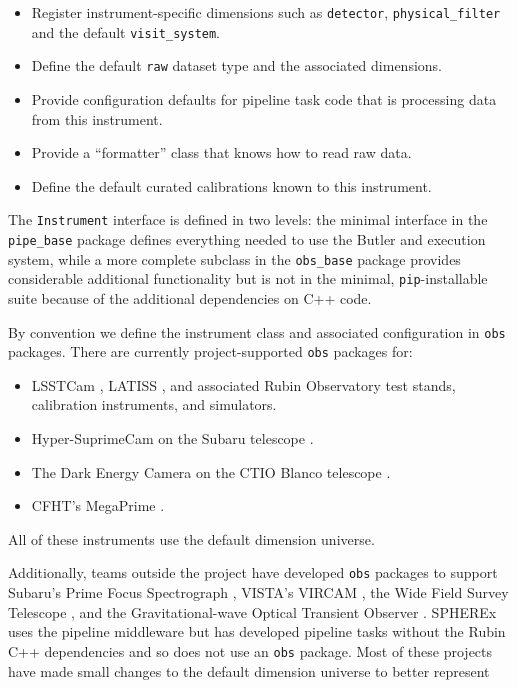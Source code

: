 \begin{itemize}
\item Register instrument-specific dimensions such as \texttt{detector}, \texttt{physical\_filter} and the default \texttt{visit\_system}.
\item Define the default \texttt{raw} dataset type and the associated dimensions.
\item Provide configuration defaults for pipeline task code that is processing data from this instrument.
\item Provide a ``formatter'' class that knows how to read raw data.
\item Define the default curated calibrations known to this instrument.
\end{itemize}

The \texttt{Instrument} interface is defined in two levels: the minimal interface in the \texttt{pipe\_base} package defines everything needed to use the Butler and execution system, while a more complete subclass in the \texttt{obs\_base} package provides considerable additional functionality but is not in the minimal, \texttt{pip}-installable suite because of the additional dependencies on C++ code.

By convention we define the instrument class and associated configuration in \texttt{obs} packages.
There are currently project-supported \texttt{obs} packages for:

\begin{itemize}
\item LSSTCam \citep{10.71929/rubin/2571927,2024SPIE13096E..1SR,2010SPIE.7735E..0JK}, LATISS \citep{10.71929/rubin/2571930,2020SPIE11452E..0UI}, and associated Rubin Observatory test stands, calibration instruments, and simulators.
\item Hyper-SuprimeCam on the Subaru telescope \citep{2018PASJ...70S...1M}.
\item The Dark Energy Camera on the CTIO Blanco telescope \citep{2015AJ....150..150F,2008SPIE.7014E..0ED}.
\item CFHT's MegaPrime \citep{2003SPIE.4841...72B}.
\end{itemize}

All of these instruments use the default dimension universe.

Additionally, teams outside the project have developed \texttt{obs} packages to support Subaru's Prime Focus Spectrograph \citep{2020SPIE11447E..7VW}, VISTA's VIRCAM \citep{2015A&A...575A..25S},
the Wide Field Survey Telescope \citep[WFST;][]{2025arXiv250115018C}, and the Gravitational-wave Optical Transient Observer \citep[GOTO;][]{2021PASA...38....4M}.
SPHEREx \citep{2020SPIE11443E..0IC} uses the pipeline middleware but has developed pipeline tasks without the Rubin C++ dependencies and so does not use an \texttt{obs} package.
Most of these projects have made small changes to the default dimension universe to better represent


